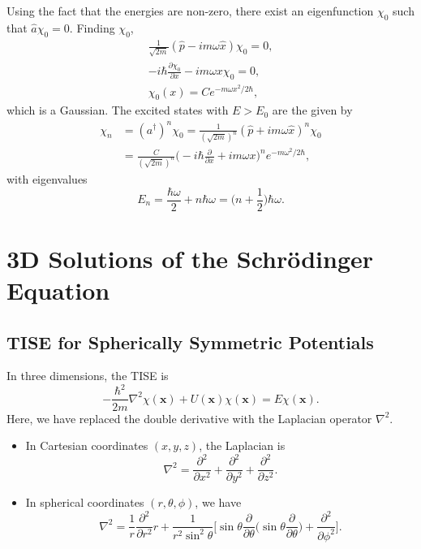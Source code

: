 \documentclass[12pt]{article}
\begin{document}
Using the fact that the energies are non-zero, there exist an eigenfunction $\chi_0$ such that $\hat a \chi_0 = 0$. Finding $\chi_0$,
\begin{align*}
	\frac{1}{\sqrt{2m}} (\hat p - i m \omega \hat x) \chi_0 = 0, \\
	- i \hbar \frac{\partial \chi_0}{\partial x} - i m \omega x \chi_0 = 0, \\
	\chi_0(x) = C e^{-m\omega x^2/2\hbar},
\end{align*}
which is a Gaussian. The excited states with $E > E_0$ are the given by
\begin{align*}
	\chi_n &= (a^{\dagger})^{n} \chi_0 = \frac{1}{(\sqrt{2m})^{n}} (\hat p + i m \omega \hat x)^{n} \chi_0 \\
	       &= \frac{C}{(\sqrt{2m})^{n}}\biggl(- i \hbar \frac{\partial}{\partial x} + i m \omega x \biggr)^{n} e^{-m \omega^2/2\hbar},
\end{align*}
with eigenvalues
\[
	E_n = \frac{\hbar \omega}{2} + n \hbar \omega = \biggl(n + \frac{1}{2} \biggr)\hbar \omega
.\]

\newpage

\section{3D Solutions of the Schr\"{o}dinger Equation}%
\label{sec:3d_solutions_of_the_schr"_o_dinger_equation}

\subsection{TISE for Spherically Symmetric Potentials}%
\label{sub:tise_for_spherically_symmetric_potentials}

In three dimensions, the TISE is
\[
	- \frac{\hbar^2}{2m} \nabla^2 \chi(\mathbf{x}) + U(\mathbf{x}) \chi(\mathbf{x}) = E \chi(\mathbf{x})
.\]
Here, we have replaced the double derivative with the Laplacian operator $\nabla^2$.
\begin{itemize}
	\item In Cartesian coordinates $(x, y, z)$, the Laplacian is
		\[
		\nabla^2 = \frac{\partial^2}{\partial x^2} + \frac{\partial^2}{\partial y^2} + \frac{\partial^2}{\partial z^2}
		.\]
	\item In spherical coordinates $(r, \theta, \phi)$, we have
		\[
			\nabla^2 = \frac{1}{r} \frac{\partial^2}{\partial r^2} r + \frac{1}{r^2 \sin^2 \theta} \biggl[ \sin \theta \frac{\partial}{\partial \theta} \biggl( \sin \theta \frac{\partial}{\partial \theta} \biggr) + \frac{\partial^2}{\partial \phi^2} \biggr]
		.\]
\end{itemize}
\end{document}
